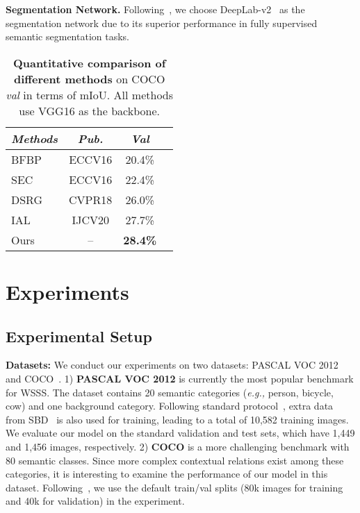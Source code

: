 \documentclass[letterpaper]{article} \usepackage{aaai21}  \usepackage{times}  \usepackage{helvet} \usepackage{courier}  \usepackage[hyphens]{url}  \usepackage{graphicx} \urlstyle{rm} \def\UrlFont{\rm}  \usepackage{graphicx}  \usepackage{natbib}  \usepackage{caption} \frenchspacing  \setlength{\pdfpagewidth}{8.5in}  \setlength{\pdfpageheight}{11in}
\newcommand{\eg}[1]{\textit{e.g.,}}
\begin{document}
\noindent\textbf{Segmentation Network.}
Following~\cite{chang2020weakly,fan2020cian}, we choose DeepLab-v2~\cite{chen2017deeplab} as the segmentation network due to its superior performance in fully supervised semantic segmentation tasks. 

\begin{table}[t]
	\centering
	\small
	\caption{\small \textbf{Quantitative comparison of different methods} on COCO \textit{val} in terms of mIoU. All methods use VGG16 as the backbone.}
	\begin{tabular}{l|c|cc}
		\hlineB{2.5}
		\textit{Methods} & \textit{Pub.}  &  \textit{Val}\\ \hline\hline
		BFBP{\!~\tiny~\cite{saleh2016built}} & ECCV16 & 20.4\%  \\ 
		SEC{\!~\tiny~\cite{kolesnikov2016seed}} & ECCV16 & 22.4\% \\ 	
		DSRG{\!~\tiny~\cite{huang2018weakly}}  & CVPR18  & 26.0\% \\
		IAL{\!~\tiny~\cite{wang2020weakly}}  &IJCV20  & 27.7\% \\
		\hline
		Ours & -- & \textbf{28.4\%}\\ \hline
	\end{tabular}
	
	\label{table:3}
\end{table}

\section{Experiments}
\subsection{Experimental Setup}

\noindent\textbf{Datasets:}
We conduct our experiments on two datasets: PASCAL VOC 2012~\cite{everingham2010pascal} and COCO~\cite{lin2014microsoft}. 1) \textbf{PASCAL VOC 2012} is currently the most popular benchmark for WSSS. The dataset contains 20 semantic categories (\eg, person, bicycle, cow) and one background category. Following standard protocol~\cite{huang2018weakly,lee2019ficklenet,wang2020self}, extra data from SBD~\cite{hariharan2011semantic} is also used for training, leading to a total of 10,582 training images. We evaluate our model on the standard validation and test sets, which have 1,449 and 1,456 images, respectively. 
2) \textbf{COCO} is a more challenging benchmark with 80 semantic classes. Since more complex contextual relations exist among these categories, it is interesting to examine the performance of our model in this dataset. Following~\cite{wang2020weakly}, we use the default train/val splits (80k images for training and 40k for validation) in the experiment.
\end{document}
